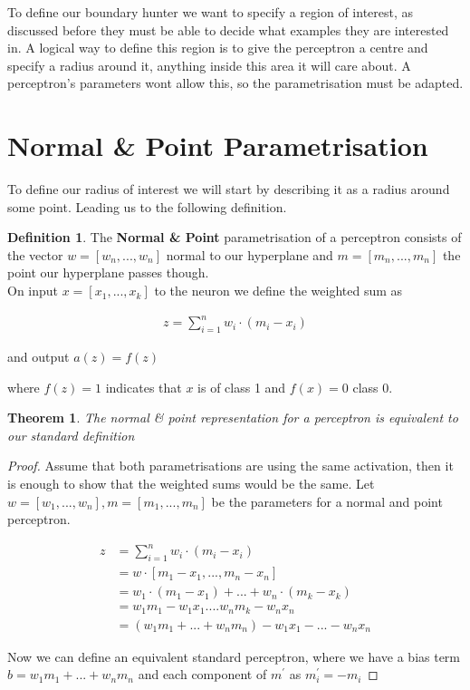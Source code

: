 \documentclass[notitlepage]{report}
\newtheorem{theorem}{Theorem}
\theoremstyle{definition}
\newtheorem{definition}{Definition}[section]
\begin{document}
To define our boundary hunter we want to specify a region of interest, as discussed before they must be able to decide what examples they are interested in. A logical way to define this region is to give the perceptron a centre and specify a radius around it, anything inside this area it will care about. A perceptron's parameters wont allow this, so the parametrisation must be adapted.

\section{Normal \& Point Parametrisation}
To define our radius of interest we will start by describing it as a radius around some point. Leading us to the following definition.

\theoremstyle{definition}
\begin{definition}
	The \textbf{Normal \& Point} parametrisation of a perceptron consists of the vector $w = [w_n, ..., w_n]$ normal to our hyperplane and $m = [m_n, ..., m_n]$ the point our hyperplane passes though.\\
	
	On input $x = [x_1, ..., x_k]$ to the neuron we define the weighted sum as 
	
	\begin{align*}
	z = \sum_{i=1}^n w_i \cdot (m_i - x_i)
	\end{align*}
	
	and output $a(z) = f(z)$
	
	where $f(z) = 1$ indicates that $x$ is of class 1 and $f(x) = 0$ class 0.
\end{definition}

\begin{theorem}
The normal \& point representation for a perceptron is equivalent to our standard definition
\end{theorem}

\begin{proof}
Assume that both parametrisations are using the same activation, then it is enough to show that the weighted sums would be the same. Let $w = [w_1, ..., w_n], m = [m_1, ..., m_n]$ be the parameters for a normal and point perceptron.

\begin{align*}
z &= \sum_{i=1}^n w_i \cdot (m_i - x_i)\\
&= w \cdot [m_1 - x_1, ..., m_n - x_n]\\
&= w_1 \cdot (m_1 - x_1) + ... + w_n \cdot (m_k - x_k)\\
&= w_1m_1 - w_1x_1 .... w_nm_k - w_nx_n\\
&= (w_1m_1 + ... + w_nm_n) - w_1x_1 - ... - w_nx_n
\end{align*}

Now we can define an equivalent standard perceptron, where we have a bias term $b = w_1m_1 + ... + w_nm_n$ and each component of $m^{'}$ as $m^{'}_i = -m_i$
\end{proof}
\end{document}
